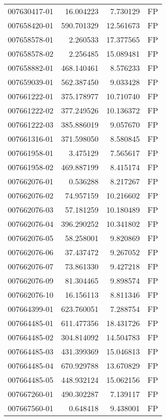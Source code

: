 \begin{tabular}{lrrl}
007630417-01 &   16.004223 &     7.730129 &   FP \\
007658420-01 &  590.701329 &    12.561673 &   FP \\
007658578-01 &    2.260533 &    17.377565 &   FP \\
007658578-02 &    2.256485 &    15.089481 &   FP \\
007658882-01 &  468.140461 &     8.576233 &   FP \\
007659039-01 &  562.387450 &     9.033428 &   FP \\
007661222-01 &  375.178977 &    10.710740 &   FP \\
007661222-02 &  377.249526 &    10.136372 &   FP \\
007661222-03 &  385.886019 &     9.057670 &   FP \\
007661316-01 &  371.598050 &     8.580845 &   FP \\
007661958-01 &    3.475129 &     7.565617 &   FP \\
007661958-02 &  469.887199 &     8.415174 &   FP \\
007662076-01 &    0.536288 &     8.217267 &   FP \\
007662076-02 &   74.957159 &    10.216602 &   FP \\
007662076-03 &   57.181259 &    10.180489 &   FP \\
007662076-04 &  396.290252 &    10.341802 &   FP \\
007662076-05 &   58.258001 &     9.820869 &   FP \\
007662076-06 &   37.437472 &     9.267052 &   FP \\
007662076-07 &   73.861330 &     9.427218 &   FP \\
007662076-09 &   81.304465 &     9.898574 &   FP \\
007662076-10 &   16.156113 &     8.811346 &   FP \\
007664399-01 &  623.760051 &     7.288754 &   FP \\
007664485-01 &  611.477356 &    18.431726 &   FP \\
007664485-02 &  304.814092 &    14.504783 &   FP \\
007664485-03 &  431.399369 &    15.046813 &   FP \\
007664485-04 &  670.929788 &    13.670829 &   FP \\
007664485-05 &  448.932124 &    15.062156 &   FP \\
007667260-01 &  490.302287 &     7.139117 &   FP \\
007667560-01 &    0.648418 &     9.438001 &   FP \\

\end{tabular}
